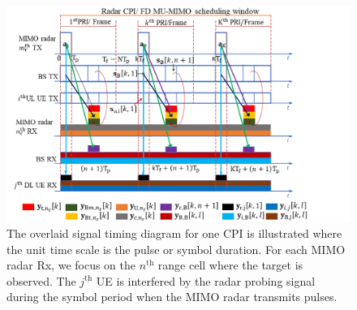 \documentclass[9pt,journal]{IEEEtran}
\newcommand{\ith}[1]    {{#1}^{\underline{\text{th}}}}
\theoremstyle{definition}
\begin{document}
\begin{figure}[!t]
		\centering
		\includegraphics[width=1.0\columnwidth]{system_model_TSP.png}
		\caption{The overlaid signal timing diagram for one CPI is illustrated where the unit time scale is the pulse or symbol duration. For each MIMO radar Rx, we focus on the $\ith{n}$ range cell where the target is observed. The $\ith{j}$ UE is interfered by the radar probing signal during the symbol period when the MIMO radar transmits pulses. %
		} 
		\vspace{-2em}
		\label{fig:systemmodel}
	\end{figure} %
\end{document}
